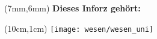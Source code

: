 \thispagestyle{empty}

\begin{textblock*}{10cm}(7mm,6mm)
    \normalsize \textbf{Dieses Inforz gehört:}
\end{textblock*}

\begin{textblock*}{4cm}(10cm,1cm)
    \texttt{[image: wesen/wesen\_uni]}
\end{textblock*}
